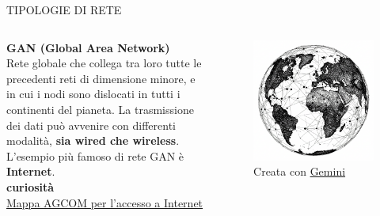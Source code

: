 \documentclass[aspectratio=1610, handout]{beamer}
\begin{document}
\begin{frame}{TIPOLOGIE DI RETE}
    \begin{columns}
            \justifying
            \textbf{GAN (Global Area Network)} \\
            Rete globale che collega tra loro tutte le precedenti reti di dimensione minore, e in cui i nodi sono 
            dislocati in tutti i continenti del pianeta. La trasmissione dei dati può avvenire con differenti modalità, 
            \textbf{sia wired che wireless}. L'esempio più famoso di rete GAN è \textbf{Internet}.\\
            \bigskip
            \tiny{\textbf{curiosità}}\\
            \tiny{\href{https://maps.agcom.it/}{Mappa AGCOM per l'accesso a Internet}}
            \begin{figure}
                \includegraphics[width=\linewidth]{img/gan.png}
                \caption{{Creata con \href{https://gemini.google.com/}{Gemini}}}
            \end{figure}
    \end{columns}
\end{frame}
\end{document}
